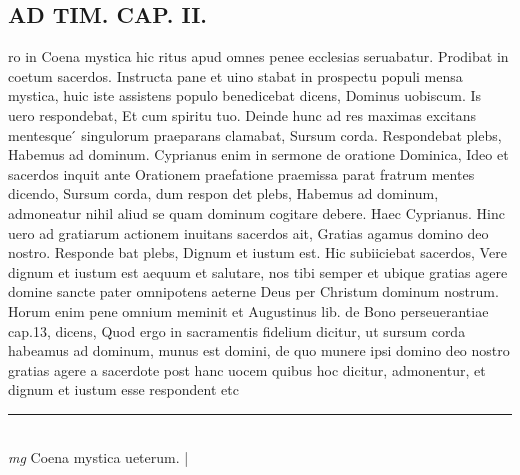 \documentclass{article}
\begin{document}
\begin{pages}
\section*{AD TIM. CAP. II. }
\marginpar{[ p.110 ]}\pstart ro in Coena mystica hic ritus apud omnes penee ecclesias seruabatur. Prodibat in coetum sacerdos. Instructa pane et uino stabat in prospectu populi mensa mystica, huic iste assistens populo benedicebat dicens, Dominus uobiscum. Is uero respondebat, Et cum spiritu tuo. Deinde hunc ad res maximas excitans mentesque ́ singulorum praeparans clamabat, Sursum corda. Respondebat plebs, Habemus ad dominum. Cyprianus enim in sermone de oratione Dominica, Ideo et sacerdos inquit ante Orationem praefatione praemissa parat fratrum mentes dicendo, Sursum corda, dum respon det plebs, Habemus ad dominum, admoneatur nihil aliud se quam dominum cogitare debere. Haec Cyprianus. Hinc uero ad gratiarum actionem inuitans sacerdos ait, Gratias agamus domino deo nostro. Responde bat plebs, Dignum et iustum est. Hic subiiciebat sacerdos, Vere dignum et iustum est aequum et salutare, nos tibi semper et ubique gratias agere domine sancte pater omnipotens aeterne Deus per Christum dominum nostrum. Horum enim pene omnium meminit et Augustinus lib. de Bono perseuerantiae cap.13, dicens, Quod ergo in sacramentis fidelium dicitur, ut sursum corda habeamus ad dominum, munus est domini, de quo munere ipsi domino deo nostro gratias agere a sacerdote post hanc uocem quibus hoc dicitur, admonentur, et dignum et iustum esse respondent etc  \pend
\vspace{0.5cm}\noindent
\vspace{0.2cm}\rule{1cm}{0.2pt}\\ 
\hspace{0.2cm}\textit{mg}
\footnotesize Coena mystica ueterum. 
\normalsize| 

\end{pages}
\end{document}
